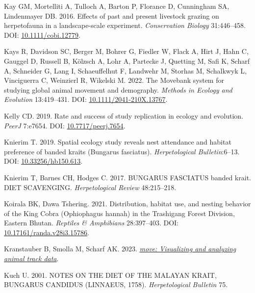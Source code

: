 \documentclass[10pt,a4paper]{article}
\newlength{\cslhangindent}
\newenvironment{CSLReferences}[2] %
 {\begin{list}{}{%
  \setlength{\itemindent}{0pt}
  \setlength{\leftmargin}{0pt}
  \setlength{\parsep}{0pt}
  \ifodd #1
   \setlength{\leftmargin}{\cslhangindent}
   \setlength{\itemindent}{-1\cslhangindent}
  \fi
  \setlength{\itemsep}{#2\baselineskip}}}
 {\end{list}}
\begin{document}
\begin{CSLReferences}{1}{0}
Kay GM, Mortelliti A, Tulloch A, Barton P, Florance D, Cunningham SA, Lindenmayer DB. 2016. Effects of past and present livestock grazing on herpetofauna in a landscape-scale experiment. \emph{Conservation Biology} 31:446--458. DOI: \href{https://doi.org/10.1111/cobi.12779}{10.1111/cobi.12779}.

Kays R, Davidson SC, Berger M, Bohrer G, Fiedler W, Flack A, Hirt J, Hahn C, Gauggel D, Russell B, Kölzsch A, Lohr A, Partecke J, Quetting M, Safi K, Scharf A, Schneider G, Lang I, Schaeuffelhut F, Landwehr M, Storhas M, Schalkwyk L, Vinciguerra C, Weinzierl R, Wikelski M. 2022. The {Movebank} system for studying global animal movement and demography. \emph{Methods in Ecology and Evolution} 13:419--431. DOI: \href{https://doi.org/10.1111/2041-210X.13767}{10.1111/2041-210X.13767}.

Kelly CD. 2019. Rate and success of study replication in ecology and evolution. \emph{PeerJ} 7:e7654. DOI: \href{https://doi.org/10.7717/peerj.7654}{10.7717/peerj.7654}.

Knierim T. 2019. Spatial ecology study reveals nest attendance and habitat preference of banded kraits ({Bungarus} fasciatus). \emph{Herpetological Bulletin}:6--13. DOI: \href{https://doi.org/10.33256/hb150.613}{10.33256/hb150.613}.

Knierim T, Barnes CH, Hodges C. 2017. BUNGARUS FASCIATUS banded krait. DIET SCAVENGING. \emph{Herpetological Review} 48:215--218.

Koirala BK, Dawa Tshering. 2021. Distribution, habitat use, and nesting behavior of the {King} {Cobra} ({Ophiophagus} hannah) in the {Trashigang} {Forest} {Division}, {Eastern} {Bhutan}. \emph{Reptiles \& Amphibians} 28:397--403. DOI: \href{https://doi.org/10.17161/randa.v28i3.15786}{10.17161/randa.v28i3.15786}.

Kranstauber B, Smolla M, Scharf AK. 2023. \emph{\href{https://CRAN.R-project.org/package=move}{{move}: Visualizing and analyzing animal track data}}.

Kuch U. 2001. {NOTES} {ON} {THE} {DIET} {OF} {THE} {MALAYAN} {KRAIT}, {BUNGARUS} {CANDIDUS} ({LINNAEUS}, 1758). \emph{Herpetological Bulletin} 75.


\end{CSLReferences}
\end{document}
